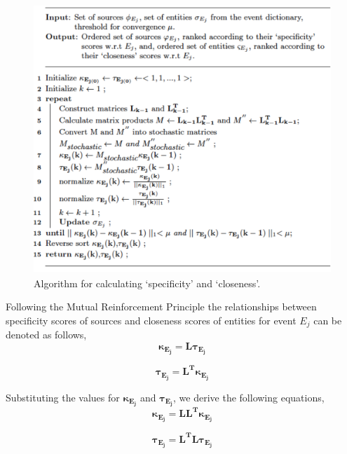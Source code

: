 \begin{figure}[htb]
\begin{center}

\includegraphics[height=4in,width=4.5in]{Figures/Chapter3Figures/algo.pdf} 
\caption{\small Algorithm for calculating `specificity' and `closeness'.} 
\label{fg:algo}
\end{center}
\end{figure}




Following the Mutual Reinforcement Principle the relationships between specificity scores of sources and closeness scores of entities for event $E_{j}$ can be denoted as follows,
\begin{equation}
\label{eq3}
\mathbf{\kappa_{E_{j}}} = \mathbf{L}\mathbf{\tau_{E_{j}}} 
\end{equation}


\begin{equation}
\label{eq4}
\mathbf{\tau_{E_{j}}} = \mathbf{L^{T}}\mathbf{\kappa_{E_{j}}}
\end{equation}

\noindent Substituting the values for $\mathbf{\kappa_{E_{j}}}$ and $\mathbf{\tau_{E_{j}}}$, we derive the following equations,
\begin{equation}
\label{eq5}
\mathbf{\kappa_{E_{j}}} = \mathbf{LL^{T}}\mathbf{\kappa_{E_{j}}} 
\end{equation}

\begin{equation}
\label{eq6}
\mathbf{\tau_{E_{j}}} = \mathbf{L^{T}L}\mathbf{\tau_{E_{j}}}
\end{equation}

